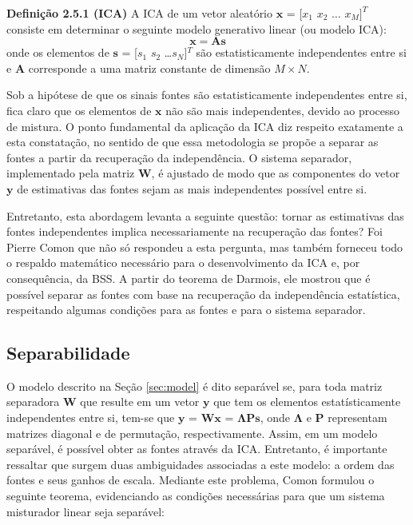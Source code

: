     \medskip
    
    \textbf{Definição 2.5.1 (ICA)} A ICA de um vetor aleatório $\mathbf{x}$ = [${x_1}$ ${x_2}$ $\dots$  ${x_M}]^T$ consiste em determinar o seguinte modelo generativo linear (ou modelo ICA):
    \begin{equation}\label{eq:simplifiedmixer}
        \mathbf{x} = \mathbf{A}\mathbf{s}
    \end{equation}
    onde os elementos de $\mathbf{s}$ = [${s_1}$ ${s_2}$ \dots  ${s_N}$]$^T$ são estatisticamente independentes entre si e $\mathbf{A}$ corresponde a uma matriz constante de dimensão $M\times N$.

    Sob a hipótese de que os sinais fontes são estatisticamente independentes entre si, fica claro que os elementos de $\mathbf{x}$ não são mais independentes, devido ao processo de mistura. O ponto fundamental da aplicação da ICA diz respeito exatamente a esta constatação, no sentido de que essa metodologia se propõe a separar as fontes a partir da recuperação da independência. O sistema separador, implementado pela matriz $\mathbf{W}$, é ajustado de modo que as componentes do vetor $\mathbf{y}$ de estimativas das fontes sejam as mais independentes possível entre si.
    
    Entretanto, esta abordagem levanta a seguinte questão: tornar as estimativas das fontes independentes implica necessariamente na recuperação das fontes? Foi Pierre Comon \cite{Comon} que não só respondeu a esta pergunta, mas também forneceu todo o respaldo matemático necessário para o desenvolvimento da ICA e, por consequência, da BSS.
    A partir do teorema de Darmois, ele mostrou que é possível separar as fontes com base na recuperação da independência estatística, respeitando algumas condições para as fontes e para o sistema separador.

\subsection{Separabilidade}\label{sec:separability}

    O modelo descrito na Seção \ref{sec:model} é dito separável se, para toda matriz separadora $\mathbf{W}$ que resulte em um vetor $\mathbf{y}$ que tem os elementos estatísticamente independentes entre si, tem-se que $\mathbf{y}$ = $\mathbf{Wx}$ = $\mathbf{\Lambda P s}$, onde $\mathbf{\Lambda}$ e $\mathbf{P}$ representam matrizes diagonal e de permutação, respectivamente. Assim, em um modelo separável, é possível obter as fontes através da ICA. Entretanto, é importante ressaltar que surgem duas ambiguidades associadas a este modelo: a ordem das fontes e seus ganhos de escala. Mediante este problema, Comon \cite{Comon} formulou o seguinte teorema, evidenciando as condições necessárias para que um sistema misturador linear seja separável:
    
